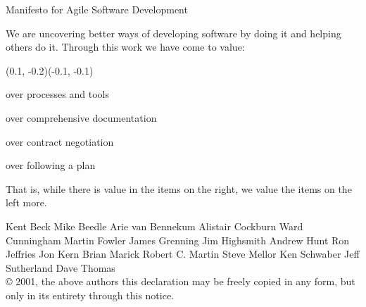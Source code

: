 



\begin{frame}{\large Manifesto for Agile Software Development}

  {\footnotesize \color{black} We are uncovering better ways of developing
  software by doing it and helping others do it.
  Through this work we have come to value:}

  \vfill

  (0.1, -0.2)(-0.1, -0.1)
  \begin{description}
    \begin{small}
      \item [Individuals and interactions] over processes and tools
      \item [Working software] over comprehensive documentation
      \item [Customer collaboration] over contract negotiation
      \item [Responding to change] over following a plan
    \end{small}
  \end{description}

  \vfill

  {\footnotesize That is, while there is value in the items on
  the right, we value the items on the left more.}

  \begin{block}{}
    {\tiny
      Kent Beck\hspace{5pt}
      Mike Beedle\hspace{5pt}
      Arie van Bennekum\hspace{5pt}
      Alistair Cockburn\hspace{5pt}
      Ward Cunningham\hspace{5pt}
      Martin Fowler\hspace{5pt}
      James Grenning\hspace{5pt}
      Jim Highsmith\hspace{5pt}
      Andrew Hunt\hspace{5pt}
      Ron Jeffries\hspace{5pt}
      Jon Kern\hspace{5pt}
      Brian Marick\hspace{5pt}
      Robert C. Martin\hspace{5pt}
      Steve Mellor\hspace{5pt}
      Ken Schwaber\hspace{5pt}
      Jeff Sutherland\hspace{5pt}
      Dave Thomas\\
      © 2001, the above authors
      this declaration may be freely copied in any form, but only in its entirety through this notice.}
  \end{block}

\end{frame}
